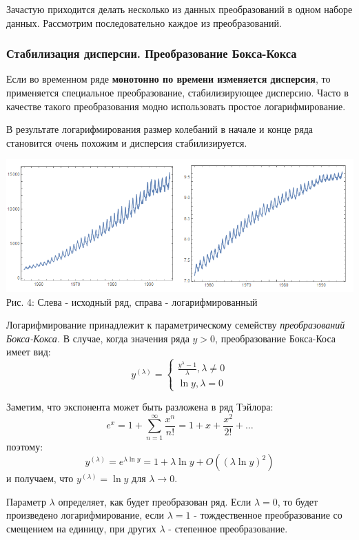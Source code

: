 \documentclass[aps,%
12pt,%
final,%
oneside,
onecolumn,%
musixtex, %
superscriptaddress,%
centertags]{article} %
\theoremstyle{plain}
\theoremstyle{definition}
\theoremstyle{remark}
\begin{document}
Зачастую приходится делать несколько из данных преобразований в одном наборе данных. Рассмотрим последовательно каждое из преобразований.

\subsubsection{Стабилизация дисперсии. Преобразование Бокса-Кокса}

Если во временном ряде \textbf{монотонно по времени изменяется дисперсия}, то применяется специальное преобразование, стабилизирующее дисперсию. Часто в качестве такого преобразования модно использовать простое логарифмирование.

В результате логарифмирования размер колебаний в начале и конце ряда становится очень похожим и дисперсия стабилизируется.

\begin{center}
	\includegraphics[scale=0.5]{images/3.png}
	Рис. 4: Слева - исходный ряд, справа - логарифмированный
\end{center}

Логарифмирование принадлежит к параметрическому семейству \textit{преобразований Бокса-Кокса.} В случае, когда значения ряда $y>0$, преобразование Бокса-Коса имеет вид:
$$y^{(\lambda)} = 
\left\{
\begin{matrix}
\frac{y^{\lambda}-1}{\lambda}, \lambda \neq 0 \\
\ln y, \lambda = 0
\end{matrix} \right. $$

Заметим, что экспонента может быть разложена в ряд Тэйлора:
$$e^x = 1 + \sum\limits_{n=1}^{\infty} \frac{x^n}{n!} = 1 + x + \frac{x^2}{2!} + \ldots $$
поэтому:
$$y^{(\lambda)} = e^{\lambda \ln y} = 1 + \lambda \ln y + O((\lambda \ln y)^2)$$
и получаем, что $y^{(\lambda)} = \ln y$ для $\lambda \to 0$.

Параметр $\lambda$ определяет, как будет преобразован ряд. Если $\lambda = 0$, то будет произведено логарифмирование, если $\lambda =1$ - тождественное преобразование со смещением на единицу, при других $\lambda$ - степенное преобразование.
\end{document}
